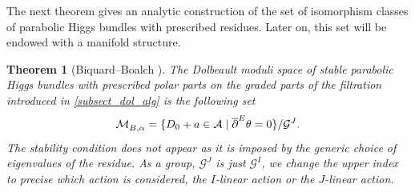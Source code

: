 \documentclass[11pt]{article}
\newcommand{\NoChangel}[1]{%
\expandafter\let\csname old\string#1\endcsname=#1
\let#1=\relax
\newcommand{#1}{\mathcode`l="716C\csname old\string#1\endcsname\mathcode`l="7160 }%
}
\newcommand{\Dol}{\mathrm{Dol}}\NoChangel{\Dol}
\theoremstyle{definition}
\theoremstyle{plain}
\newtheorem{theorem}[definition]{Theorem}
\begin{document}
The next theorem gives an analytic construction of the set of isomorphism classes of parabolic Higgs bundles with prescribed residues.
Later on, this set will be endowed with a manifold structure.
\begin{theorem}[Biquard--Boalch {\cite[\S7]{Biquard_Boalch_2004}}]
The Dolbeault moduli space of stable parabolic Higgs bundles with prescribed polar parts on the graded parts of the filtration introduced in \ref{subsect_dol_alg} is the following set
\[
\mathcal{M}^{\Dol}_{B, \alpha} =\lbrace D_0 + a \in \mathcal{A} \mid \overline{\partial}^E \theta =0\rbrace/ \mathcal{G}^{J}.
\]
The stability condition does not appear as it is imposed by the generic choice of eigenvalues of the residue. As a group, $\mathcal{G}^J$ is just $\mathcal{G}^I$, we change the upper index to precise which action is considered, the $I$-linear action or the $J$-linear action.
\end{theorem}
\end{document}
